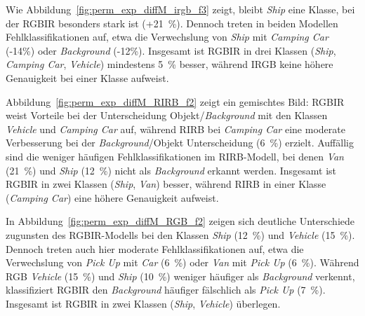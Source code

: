 Wie Abbildung~\ref{fig:perm_exp_diffM_irgb_f3} zeigt, bleibt \textit{Ship} eine Klasse, bei der RGBIR besonders stark ist (+21~\%). Dennoch treten in beiden Modellen Fehlklassifikationen auf, etwa die Verwechslung von \textit{Ship} mit \textit{Camping Car} (-14\%) oder \textit{Background} (-12\%). Insgesamt ist RGBIR in drei Klassen (\textit{Ship}, \textit{Camping Car}, \textit{Vehicle}) mindestens 5~\% besser, während IRGB keine höhere Genauigkeit bei einer Klasse aufweist.

%     

Abbildung~\ref{fig:perm_exp_diffM_RIRB_f2} zeigt ein gemischtes Bild: RGBIR weist Vorteile bei der Unterscheidung Objekt/\textit{Background} mit den Klassen \textit{Vehicle} und \textit{Camping Car} auf, während RIRB bei \textit{Camping Car} eine moderate Verbesserung bei der \textit{Background}/Objekt Unterscheidung (6~\%) erzielt. Auffällig sind die weniger häufigen Fehlklassifikationen im RIRB-Modell, bei denen \textit{Van} (21~\%) und \textit{Ship} (12~\%) nicht als \textit{Background} erkannt werden. Insgesamt ist RGBIR in zwei Klassen (\textit{Ship}, \textit{Van}) besser, während RIRB in einer Klasse (\textit{Camping Car}) eine höhere Genauigkeit aufweist.

%     

In Abbildung~\ref{fig:perm_exp_diffM_RGB_f2} zeigen sich deutliche Unterschiede zugunsten des RGBIR-Modells bei den Klassen \textit{Ship} (12~\%) und \textit{Vehicle} (15~\%). Dennoch treten auch hier moderate Fehlklassifikationen auf, etwa die Verwechslung von \textit{Pick Up} mit \textit{Car} (6~\%) oder \textit{Van} mit \textit{Pick Up} (6~\%). Während RGB \textit{Vehicle} (15~\%) und \textit{Ship} (10~\%) weniger häufiger als \textit{Background} verkennt, klassifiziert RGBIR den \textit{Background} häufiger fälschlich als \textit{Pick Up} (7~\%). Insgesamt ist RGBIR in zwei Klassen (\textit{Ship}, \textit{Vehicle}) überlegen.

